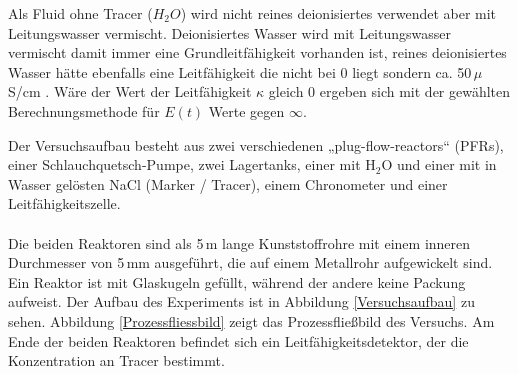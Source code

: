 \documentclass[12pt,liststotoc]{report}
\begin{document}
Als Fluid ohne Tracer ($H_2O$) wird nicht reines deionisiertes verwendet aber mit Leitungswasser vermischt. Deionisiertes Wasser wird mit Leitungswasser vermischt damit immer eine Grundleitfähigkeit vorhanden ist, reines deionisiertes Wasser hätte ebenfalls eine Leitfähigkeit die nicht bei 0 liegt sondern ca. 50\,$\mu$S/cm \cite{Leitfahigkeit_Wasser}. Wäre der Wert der Leitfähigkeit $\kappa$ gleich 0 ergeben sich mit der gewählten Berechnungsmethode für $E(t)$ Werte gegen $\infty$.


Der Versuchsaufbau besteht aus zwei verschiedenen „plug-flow-reactors“ (PFRs), einer Schlauchquetsch-Pumpe, zwei Lagertanks, einer mit H$_2$O und einer mit in Wasser gelösten NaCl (Marker / Tracer), einem Chronometer und einer Leitfähigkeitszelle.
\\
\\
Die beiden Reaktoren sind als 5\,m lange Kunststoffrohre mit einem inneren Durchmesser von 5\,mm ausgeführt, die auf einem Metallrohr aufgewickelt sind. Ein Reaktor ist mit Glaskugeln gefüllt, während der andere keine Packung aufweist. Der Aufbau des Experiments ist in Abbildung \ref{Versuchsaufbau} zu sehen. Abbildung \ref{Prozessfliessbild} zeigt das Prozessfließbild des Versuchs. Am Ende der beiden Reaktoren befindet sich ein Leitfähigkeitsdetektor, der die Konzentration an Tracer bestimmt.

\end{document}
